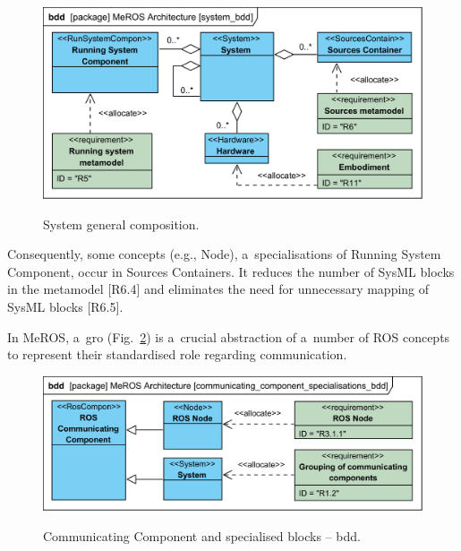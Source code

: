 \documentclass[11pt,oneside,a4paper]{report}
\begin{document}
		
	\begin{figure}[H]
		\centering
		\begin{center}
			{\includegraphics[scale=1.0]{diagrams/system_bdd.png}}
		\end{center}
		\caption{System general composition.} 
		\label{fig:ros_system_bdd}
	\end{figure}
	
	Consequently, some concepts (e.g., Node), a~specialisations of Running System Component, occur in Sources Containers. It reduces the number of SysML blocks in the metamodel [R6.4] and eliminates the need for unnecessary mapping of SysML blocks [R6.5].
		
	\pagebreak	
		
	In MeROS, a~gro (Fig.~\ref{fig:communicating_components_bdd}) is a~crucial abstraction of a~number of ROS concepts to represent their standardised role regarding communication. 
	
		
	\begin{figure}[H]
		\centering
		\begin{center}
			{\includegraphics[scale=1.0]{diagrams/communicating_component_specialisations_bdd.png}}
		\end{center}
		\caption{Communicating Component and specialised blocks -- bdd.} 
		\label{fig:communicating_components_bdd}
	\end{figure}
	
\end{document}

